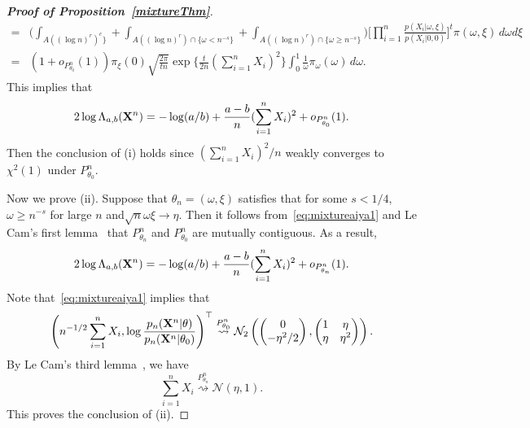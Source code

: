 \documentclass[11pt]{article}
\theoremstyle{plain}
\theoremstyle{definition}
\theoremstyle{remark}
\begin{document}
\begin{appendices}
\begin{proof}[\textbf{Proof of Proposition~\ref{mixtureThm}}]
\begin{align*}
=& \bigg( \int_{A( (\log n)^r )^c\}}+\int_{A( (\log n)^r )\cap \{\omega< n^{-s}\}}+\int_{A( (\log n)^r )\cap \{\omega\geq n^{-s}\}}\bigg) \Big[\prod_{i=1}^n \frac{p(X_i|\omega,\xi)}{p(X_i|0,0)}\Big]^t \pi(\omega,\xi)\, d\omega d\xi
    \\
    =&
    (1+o_{P^n_{\theta_0}}(1))\pi_{\xi}(0)\sqrt{\frac{2\pi}{tn}}\exp \Big\{ \frac{t}{2n}(\sum_{i=1}^n X_i)^2\Big\} 
\int_{0}^1 
\frac{1}{\omega}
\pi_{\omega}(\omega)\, d\omega.
\end{align*}
This implies that
\begin{equation*}
    2\log \Lambda_{a,b} (\mathbf{X}^n)=-\log(a/b)+\frac{a-b}{n}(\sum_{i=1}^n X_i)^2+o_{P^n_{\theta_0}}(1).
\end{equation*}
Then the conclusion of (i) holds since $(\sum_{i=1}^n X_i)^2/n$ weakly converges to $ \chi^2(1)$ under $P^n_{\theta_0}$.

Now we prove (ii). Suppose that $\theta_n=(\omega,\xi)$ satisfies that for some $s<1/4$, $\omega\geq n^{-s}$ for large $n$ and$\sqrt{n}\omega \xi \to \eta$.
Then it follows from~\eqref{eq:mixtureaiya1} and Le Cam's first lemma~\citep[Theorem 6.4]{van2000asymptotic} that
$P^n_{\theta_n}$ and $P^n_{\theta_0}$ are mutually contiguous.
As a result,
\begin{equation*}
    2\log \Lambda_{a,b} (\mathbf{X}^n) = -\log(a/b)+\frac{a-b}{n}(\sum_{i=1}^n X_i)^2+o_{P^n_{\theta_n}}(1).
\end{equation*}
Note that~\eqref{eq:mixtureaiya1} implies that
\begin{equation*}
        \left(n^{-1/2}\sum_{i=1}^n X_i,\log \frac{p_n(\mathbf{X}^{n}|\theta)}{p_n(\mathbf{X}^{n}|\theta_0)}\right)^\top 
        \overset{P^n_{\theta_0}}{\rightsquigarrow}
        \mathcal{N}_2\left(
    \begin{pmatrix}
        0\\
        -{\eta^2}/{2}
    \end{pmatrix}
    ,
    \begin{pmatrix}
        1 & \eta\\
        \eta & \eta^2
    \end{pmatrix}
\right).
\end{equation*}
By Le Cam's third lemma~\citep[Example 6.7]{van2000asymptotic}, we have
\begin{equation*}
    \sum_{i=1}^n X_i
    \overset{P^n_{\theta_n}}{\rightsquigarrow} \mathcal{N}(\eta,1).
\end{equation*}
This proves the conclusion of (ii).

\end{proof}

\end{appendices}
\end{document}
